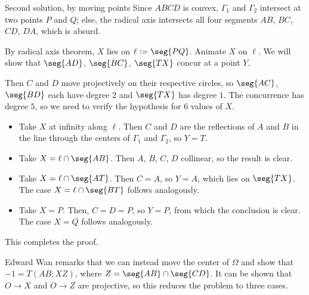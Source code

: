 \begin{customenv}{Second solution, by moving points}
    Since $ABCD$ is convex, $\Gamma_1$ and $\Gamma_2$ intersect at two points $P$ and $Q$; else, the radical axis intersects all four segments $AB$, $BC$, $CD$, $DA$, which is absurd.

    By radical axis theorem, $X$ lies on $\ell:=\seg{PQ}$. Animate $X$ on $\ell$. We will show that $\seg{AD}$, $\seg{BC}$, $\seg{TX}$ concur at a point $Y$.

    Then $C$ and $D$ move projectively on their respective circles, so $\seg{AC}$, $\seg{BD}$ each have degree $2$ and $\seg{TX}$ has degree $1$. The concurrence has degree $5$, so we need to verify the hypothesis for $6$ values of $X$.
    \begin{itemize}
        \item Take $X$ at infinity along $\ell$. Then $C$ and $D$ are the reflections of $A$ and $B$ in the line through the centers of $\Gamma_1$ and $\Gamma_2$, so $Y=T$.
        \item Take $X=\ell\cap\seg{AB}$. Then $A$, $B$, $C$, $D$ collinear, so the result is clear.
        \item Take $X=\ell\cap\seg{AT}$. Then $C=A$, so $Y=A$, which lies on $\seg{TX}$. The case $X=\ell\cap\seg{BT}$ follows analogously.
        \item Take $X=P$. Then, $C=D=P$, so $Y=P$, from which the conclusion is clear. The case $X=Q$ follows analogously.
    \end{itemize}
    This completes the proof.
    \begin{boxremark}
        Edward Wan remarks that we can instead move the center of $\Omega$ and show that $-1=T(AB;XZ)$, where $Z=\seg{AB}\cap\seg{CD}$. It can be shown that $O\to X$ and $O\to Z$ are projective, so this reduces the problem to three cases.
    \end{boxremark}
\end{customenv}

